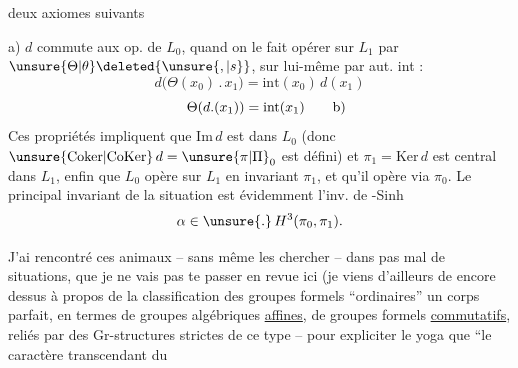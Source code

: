 deux axiomes suivants

a) $d$ commute aux op. de $L_0$, quand on le fait opérer sur $L_1$ par $\unsure{\Theta|\theta}\deleted{\unsure{,|s}}$, sur lui-même par aut. int :
\[
d\bigl(\Theta(x_0)\mathbin{.}x_1\bigr)=\mathrm{int}(x_0)\,d(x_1)
\]
\[
\Theta(d.(x_1))=\mathrm{int}(x_1)\tag*{\makebox[0pt][r]{\makebox[\displaywidth][l]{b)}}}
\]
Ces propriétés impliquent que $\mathrm{Im}\,d$ est  dans $L_0$ (donc $\unsure{\mathrm{Coker}|\mathrm{CoKer}}\,d=\unsure{\pi|\Pi}_0$ est défini) et $\pi_1=\mathrm{Ker}\,d$ est central dans $L_1$, enfin que $L_0$ opère sur $L_1$ en invariant $\pi_1$, et qu'il opère via $\pi_0$. Le principal invariant  de la situation est évidemment l'inv. de -Sinh
\[
\alpha\in\unsure{.}\,H^3(\pi_0,\pi_1).
\]

J'ai rencontré ces animaux -- sans même les chercher -- dans pas mal de situations, que je ne vais pas te passer en revue ici (je viens d'ailleurs de  encore dessus à propos de la classification des groupes formels ``ordinaires''  un corps parfait, en termes de groupes algébriques \uline{affines}, de groupes formels \uline{commutatifs}, reliés par des Gr-structures strictes de ce type%
 -- pour expliciter le yoga que ``le caractère transcendant du
